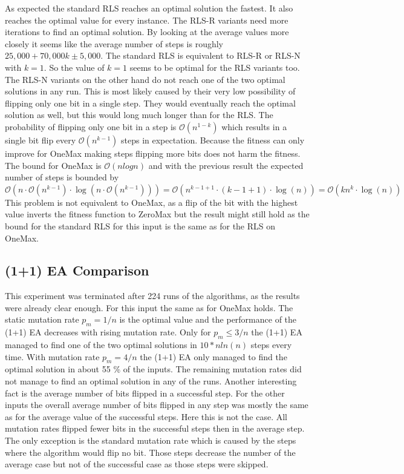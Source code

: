 As expected the standard RLS reaches an optimal solution the fastest.
It also reaches the optimal value for every instance.
The RLS-R variants need more iterations to find an optimal solution.
By looking at the average values more closely it seems like the average number of steps is roughly $25,000 + 70,000k \pm 5,000$.
The standard RLS is equivalent to RLS-R or RLS-N with $k=1$.
So the value of $k=1$ seems to be optimal for the RLS variants too.
The RLS-N variants on the other hand do not reach one of the two optimal solutions in any run.
This is most likely caused by their very low possibility of flipping only one bit in a single step.
They would eventually reach the optimal solution as well, but this would long much longer than for the RLS.
The probability of flipping only one bit in a step is $\mathcal{O}(n^{1-k})$ which results in a single bit flip every $\mathcal{O}(n^{k-1})$ steps in expectation.
Because the fitness can only improve for OneMax making steps flipping more bits does not harm the fitness.
The bound for OneMax is $\mathcal{O}(nlogn)$ and with the previous result the expected number of steps is bounded by
$\mathcal{O}(n\cdot\mathcal{O}(n^{k-1})\cdot \log(n\cdot\mathcal{O}(n^{k-1}))) 
=\mathcal{O}(n^{k-1+1}\cdot (k-1+1)\cdot\log(n))
=\mathcal{O}(kn^{k}\cdot\log(n))$
This problem is not equivalent to OneMax, as a flip of the bit with the highest value inverts the fitness function to ZeroMax but the result might still hold as the bound for the standard RLS for this input is the same as for the RLS on OneMax.
\subsection{(1+1) EA Comparison}




This experiment was terminated after 224 runs of the algorithms, as the results were already clear enough.
For this input the same as for OneMax holds. 
The static mutation rate $p_m=1/n$ is the optimal value and the performance of the (1+1) EA decreases with rising mutation rate.
Only for $p_m\le3/n$ the (1+1) EA managed to find one of the two optimal solutions in $10*nln(n)$ steps every time.
With mutation rate $p_m=4/n$ the (1+1) EA only managed to find the optimal solution in about 55 \% of the inputs.
The remaining mutation rates did not manage to find an optimal solution in any of the runs.
Another interesting fact is the average number of bits flipped in a successful step.
For the other inputs the overall average number of bits flipped in any step was mostly the same as for the average value of the successful steps. Here this is not the case.
All mutation rates flipped fewer bits in the successful steps then in the average step.
The only exception is the standard mutation rate which is caused by the steps where the algorithm would flip no bit.
Those steps decrease the number of the average case but not of the successful case as those steps were skipped.
